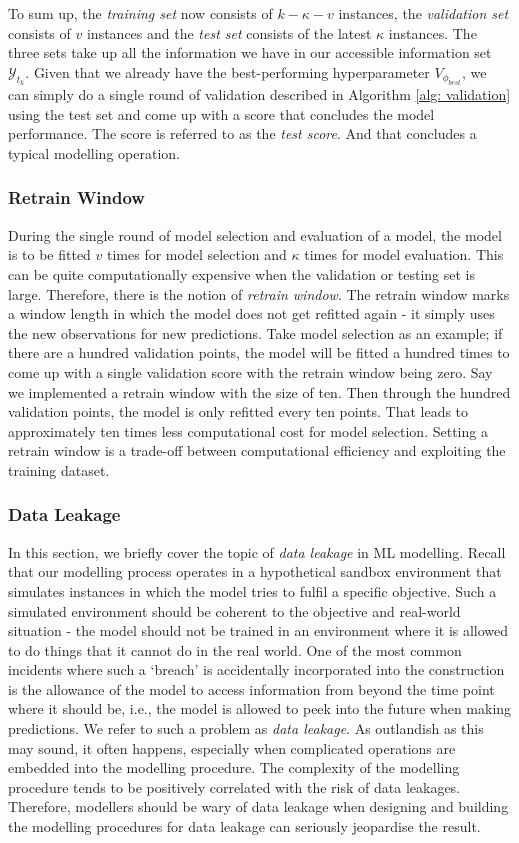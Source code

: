 To sum up, the \textit{training set} now consists of $k - \kappa - v$ instances, the \textit{validation set} consists of $v$ instances and the \textit{test set} consists of the latest $\kappa$ instances. The three sets take up all the information we have in our accessible information set $\mathcal{Y}_{t_k}$. Given that we already have the best-performing hyperparameter $V_{\phi_{best}}$, we can simply do a single round of validation described in Algorithm \ref{alg: validation} using the test set and come up with a score that concludes the model performance. The score is referred to as the \textit{test score}. And that concludes a typical modelling operation.

\subsubsection{Retrain Window}
During the single round of model selection and evaluation of a model, the model is to be fitted $v$ times for model selection and $\kappa$ times for model evaluation. This can be quite computationally expensive when the validation or testing set is large. Therefore, there is the notion of \textit{retrain window}. The retrain window marks a window length in which the model does not get refitted again - it simply uses the new observations for new predictions. Take model selection as an example; if there are a hundred validation points, the model will be fitted a hundred times to come up with a single validation score with the retrain window being zero. Say we implemented a retrain window with the size of ten. Then through the hundred validation points, the model is only refitted every ten points. That leads to approximately ten times less computational cost for model selection. Setting a retrain window is a trade-off between computational efficiency and exploiting the training dataset.

\subsubsection{Data Leakage}\label{subsubsec: data leakage}
In this section, we briefly cover the topic of \textit{data leakage} in ML modelling. Recall that our modelling process operates in a hypothetical sandbox environment that simulates instances in which the model tries to fulfil a specific objective. Such a simulated environment should be coherent to the objective and real-world situation - the model should not be trained in an environment where it is allowed to do things that it cannot do in the real world. One of the most common incidents where such a `breach' is accidentally incorporated into the construction is the allowance of the model to access information from beyond the time point where it should be, i.e., the model is allowed to peek into the future when making predictions. We refer to such a problem as \textit{data leakage}. As outlandish as this may sound, it often happens, especially when complicated operations are embedded into the modelling procedure. The complexity of the modelling procedure tends to be positively correlated with the risk of data leakages. Therefore, modellers should be wary of data leakage when designing and building the modelling procedures for data leakage can seriously jeopardise the result.
